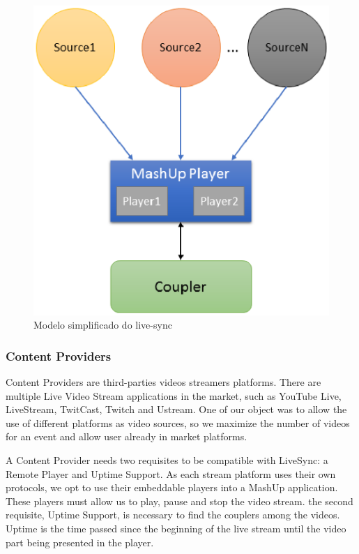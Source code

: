 \documentclass{sig-alternate-05-2015}
\begin{document}
\begin{figure}[h]
	\centerline{\includegraphics[scale=0.6] {figure/arqchitecture}}
	\caption{Modelo simplificado do live-sync}
	\label{livesync}
\end{figure}

\subsubsection{Content Providers}
Content Providers are third-parties videos streamers platforms. There are multiple Live Video Stream applications in the market, such as YouTube Live, LiveStream, TwitCast, Twitch and Ustream. One of our object was to allow the use of different platforms as video sources, so we maximize the number of videos for an event and allow user already in market platforms. 

A Content Provider needs two requisites to be compatible with LiveSync: a Remote Player and Uptime Support. As each stream platform uses their own protocols, we opt to use their embeddable players into a MashUp application. These players must allow us to play, pause and stop the video stream. the second requisite, Uptime Support, is necessary to find the couplers among the videos. Uptime is the time passed since the beginning of the live stream until the video part being presented in the player.
\end{document}
